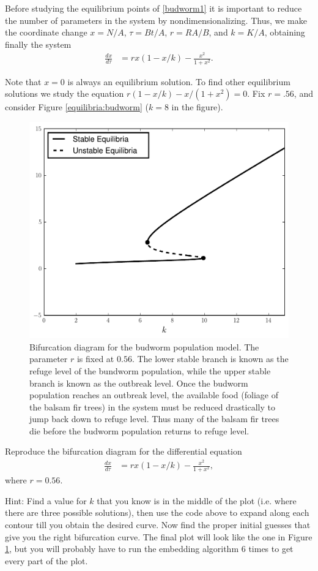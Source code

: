 Before studying the equilibrium points of \eqref{budworm1} it is important to reduce the number of parameters in the system by nondimensionalizing.
Thus, we make the coordinate change $x = N/A$, $\tau = Bt/A$, $r = RA/B$, and $k = K/A$, obtaining finally the system
\begin{align}
	\frac{dx}{d \tau} &= rx(1-x/k) - \frac{x^2}{1+x^2}.
\end{align}

Note that $x = 0$ is always an equilibrium solution.
To find other equilibrium solutions we study the equation $r(1-x/k)-x/(1+x^2) = 0$.
Fix $r = .56$, and consider Figure \eqref{equilibria:budworm} ($k=8$ in the figure).

\begin{figure}
\centering
\includegraphics[width=\textwidth]{BudwormPopulation.pdf}
\caption{Bifurcation diagram for the budworm population model.
The parameter $r$ is fixed at $0.56.$
The lower stable branch is known as the refuge level of the bundworm population, while the upper stable branch is known as the outbreak level.
Once the budworm population reaches an outbreak level, the available food (foliage of the balsam fir trees) in the system must be reduced drastically to jump back down to refuge level.
Thus many of the balsam fir trees die before the budworm population returns to refuge level.}
\label{bifurcation:budworm}
\end{figure}

\begin{problem}
Reproduce the bifurcation diagram for the differential equation
\begin{align*}
	\frac{dx}{d \tau} &= rx(1-x/k) - \frac{x^2}{1+x^2},
\end{align*}
where $r = 0.56$.

Hint: Find a value for $k$ that you know is in the middle of the plot (i.e. where there are three possible solutions), then use the code above to expand along each contour till you obtain the desired curve.
Now find the proper initial guesses that give you the right bifurcation curve.
The final plot will look like the one in Figure \ref{bifurcation:budworm}, but you will probably have to run the embedding algorithm 6 times to get every part of the plot.
\end{problem} 
